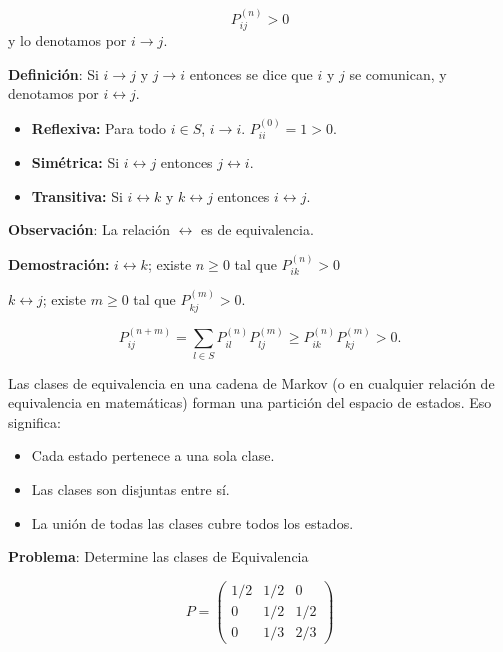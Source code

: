 \documentclass[12pt,a4paper]{article}
\begin{document}
\begin{equation*}
P_{ij}^{(n)} > 0
\end{equation*}
y lo denotamos por $i \to j$.

\textbf{Definición}: Si $i \to j$ y $j \to i$ entonces se dice que $i$ y $j$ se comunican, y denotamos por $i \leftrightarrow j$.

\begin{itemize}
    \item \textbf{Reflexiva:} Para todo $i \in S$, $i \to i$. $P_{ii}^{(0)} = 1 > 0$.
    \item \textbf{Simétrica:} Si $i \leftrightarrow j$ entonces $j \leftrightarrow i$.
    \item \textbf{Transitiva:} Si $i \leftrightarrow k$ y $k \leftrightarrow j$ entonces $i \leftrightarrow j$.
\end{itemize}

\textbf{Observación}: La relación $\leftrightarrow$ es de equivalencia.

\textbf{Demostración:} $i \leftrightarrow k$; existe $n \geq 0$ tal que $P_{ik}^{(n)} > 0$

$k \leftrightarrow j$; existe $m \geq 0$ tal que $P_{kj}^{(m)} > 0$.

\begin{equation*}
P_{ij}^{(n+m)} = \sum_{l \in S} P_{il}^{(n)} P_{lj}^{(m)} \geq P_{ik}^{(n)} P_{kj}^{(m)} > 0.
\end{equation*}


Las clases de equivalencia en una cadena de Markov (o en cualquier relación de equivalencia en matemáticas) forman una partición del espacio de estados. Eso significa:

\begin{itemize}
    \item Cada estado pertenece a una sola clase.
    \item Las clases son disjuntas entre sí.
    \item La unión de todas las clases cubre todos los estados.
\end{itemize}


\textbf{Problema}: Determine las clases de Equivalencia

\begin{equation*}
P = \begin{pmatrix}
1/2 & 1/2 & 0 \\
0 & 1/2 & 1/2 \\
0 & 1/3 & 2/3
\end{pmatrix}
\end{equation*}
\end{document}
